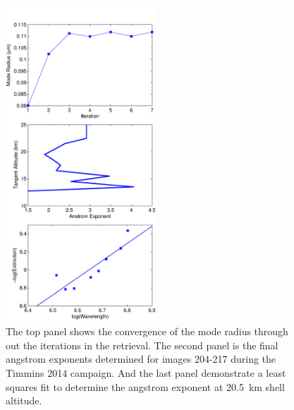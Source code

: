 \documentclass[12pt]{article}
\begin{document}
\begin{figure}
\includegraphics[width=0.5\textwidth]{./Images/ParticelSize.pdf}
    \caption{The top panel shows the convergence of the mode radius through out the iterations in the retrieval. The second panel is the final angstrom exponents determined for images 204-217 during the Timmins 2014 campaign. And the last panel demonstrate a least squares fit to determine the angstrom exponent at 20.5~km shell altitude.}
    \label{fig:ParticleSize}
\end{figure}
\end{document}

